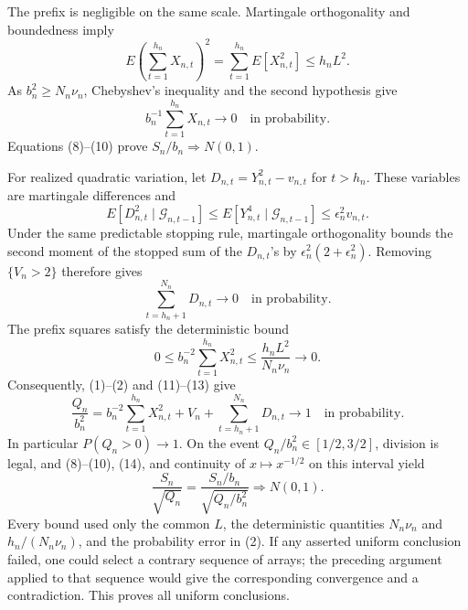 The prefix is negligible on the same scale.  Martingale orthogonality and
boundedness imply
\[
 E\left(\sum_{t=1}^{h_n}X_{n,t}\right)^2
 =\sum_{t=1}^{h_n}E[X_{n,t}^2]\le h_nL^2.
\tag{9}
\]
As \(b_n^2\ge N_n\nu_n\), Chebyshev's inequality and the second hypothesis
give
\[
 b_n^{-1}\sum_{t=1}^{h_n}X_{n,t}\longrightarrow0
 \quad\text{in probability}.
\tag{10}
\]
Equations (8)--(10) prove \(S_n/b_n\Rightarrow N(0,1)\).

For realized quadratic variation, let
\(D_{n,t}=Y_{n,t}^2-v_{n,t}\) for \(t>h_n\).  These variables are martingale
differences and
\[
 E[D_{n,t}^2\mid\mathcal G_{n,t-1}]
 \le E[Y_{n,t}^4\mid\mathcal G_{n,t-1}]
 \le\epsilon_n^2v_{n,t}.
\tag{11}
\]
Under the same predictable stopping rule, martingale orthogonality bounds the
second moment of the stopped sum of the \(D_{n,t}\)'s by
\(\epsilon_n^2(2+\epsilon_n^2)\).  Removing \(\{V_n>2\}\) therefore gives
\[
 \sum_{t=h_n+1}^{N_n}D_{n,t}\longrightarrow0
 \quad\text{in probability}.
\tag{12}
\]
The prefix squares satisfy the deterministic bound
\[
 0\le b_n^{-2}\sum_{t=1}^{h_n}X_{n,t}^2
 \le\frac{h_nL^2}{N_n\nu_n}\longrightarrow0.
\tag{13}
\]
Consequently, (1)--(2) and (11)--(13) give
\[
 \frac{Q_n}{b_n^2}
 =b_n^{-2}\sum_{t=1}^{h_n}X_{n,t}^2+V_n
 +\sum_{t=h_n+1}^{N_n}D_{n,t}
 \longrightarrow1
 \quad\text{in probability}.
\tag{14}
\]
In particular \(P(Q_n>0)\to1\).  On the event
\(Q_n/b_n^2\in[1/2,3/2]\), division is legal, and (8)--(10), (14), and
continuity of \(x\mapsto x^{-1/2}\) on this interval yield
\[
 \frac{S_n}{\sqrt{Q_n}}
 =\frac{S_n/b_n}{\sqrt{Q_n/b_n^2}}\Rightarrow N(0,1).
\tag{15}
\]
Every bound used only the common \(L\), the deterministic quantities
\(N_n\nu_n\) and \(h_n/(N_n\nu_n)\), and the probability error in (2).
If any asserted uniform conclusion failed, one could select a contrary
sequence of arrays; the preceding argument applied to that sequence would
give the corresponding convergence and a contradiction.  This proves all
uniform conclusions.